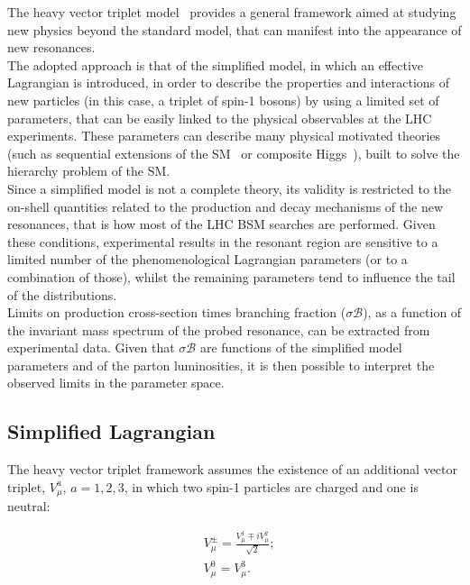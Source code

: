 The heavy vector triplet model~\cite{Pappadopulo2014} provides a general framework aimed at studying new physics beyond the standard model, that can manifest into the appearance of new resonances.\\
The adopted approach is that of the simplified model, in which an effective Lagrangian is introduced, in order to describe the properties and interactions of new particles (in this case, a triplet of spin-1 bosons) by using a limited set of parameters, that can be easily linked to the physical observables at the LHC experiments. These parameters can describe many physical motivated theories (such as sequential extensions of the SM~\cite{Barger:1980ix,Grojean:2011vu} or composite Higgs~\cite{Contino2011,Bellazzini:2014yua}), built to solve the hierarchy problem of the SM. \\
Since a simplified model is not a complete theory, its validity is restricted to the on-shell quantities related to the production and decay mechanisms of the new resonances, that is how most of the LHC BSM searches are performed. Given these conditions, experimental results in the resonant region are sensitive to a limited number of the phenomenological Lagrangian parameters (or to a combination of those), whilst the remaining parameters tend to influence the tail of the distributions.\\
Limits on production cross-section times branching fraction ($\sigma \mathcal{B}$), as a function of the invariant mass spectrum of the probed resonance, can be extracted from experimental data. Given that $\sigma \mathcal{B}$ are functions of the simplified model parameters and of the parton luminosities, it is then possible to interpret the observed limits in the parameter space.

\subsection{Simplified Lagrangian}
\label{sec:HVT_lagr}

The heavy vector triplet framework assumes the existence of an additional vector triplet, $V_{\mu}^a$, $a=1,2,3$, in which two spin-1 particles are charged and one is neutral:

\begin{equation}
\begin{split}
& V_{\mu}^{\pm} = \frac{V_{\mu}^1 \mp i V_{\mu}^2}{\sqrt{2}};\\
& V_{\mu}^0 = V_{\mu}^3.\\
\end{split}
\label{eq:V_triplet}
\end{equation}


